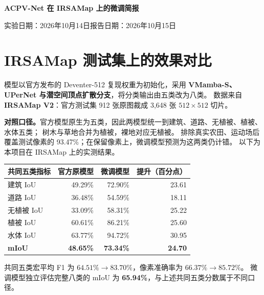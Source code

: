 \documentclass[UTF8,fontset=fandol,a4paper,10pt]{ctexart}
\begin{document}
\begin{center}
 {\LARGE\bfseries ACPV-Net 在 IRSAMap 上的微调简报}\par
 \vspace{3pt}
 {\small 实验日期：2026年10月14日\quad 报告日期：2026年10月15日}
\end{center}
\vspace{-6pt}

\section{IRSAMap 测试集上的效果对比}
模型以官方发布的 Deventer-512 复现权重为初始化，采用
\textbf{VMamba-S、UPerNet 与潜空间顶点扩散分支}，将分类输出由五类改为八类。
数据来自 \textbf{IRSAMap V2}：官方测试集 912 张原图裁成 3,648 张 $512\times512$ 切片。

\textbf{对照口径。}官方模型原生为五类，因此两模型统一到建筑、道路、无植被、植被、水体五类；
树木与草地合并为植被，裸地对应无植被。
排除真实农田、运动场后覆盖测试像素的 93.47\%；在保留像素上，微调模型预测为这两类仍计错。
以下为本项目在 IRSAMap 上的实测结果。

\begin{center}
\small
\setlength{\tabcolsep}{13pt}
\renewcommand{\arraystretch}{1.12}
\begin{tabular}{lrrr}
\toprule
共同五类指标 & 官方原模型 & 微调模型 & 提升（百分点）\\
\midrule
建筑 IoU & 49.29\% & 72.90\% & 23.61\\
道路 IoU & 36.48\% & 54.59\% & 18.11\\
无植被 IoU & 33.09\% & 58.31\% & 25.22\\
植被 IoU & 60.61\% & 86.21\% & 25.60\\
水体 IoU & 63.77\% & 94.72\% & 30.95\\
\midrule
\textbf{mIoU} & \textbf{48.65\%} & \textbf{73.34\%} & \textbf{24.70}\\
\bottomrule
\end{tabular}
\end{center}
\vspace{-3pt}
共同五类宏平均 F1 为 $64.51\%\rightarrow83.70\%$，像素准确率为
$66.37\%\rightarrow85.72\%$。
微调模型独立评估完整八类的 mIoU 为 \textbf{65.94\%}，与上述共同五类分数属于不同口径。
\end{document}
